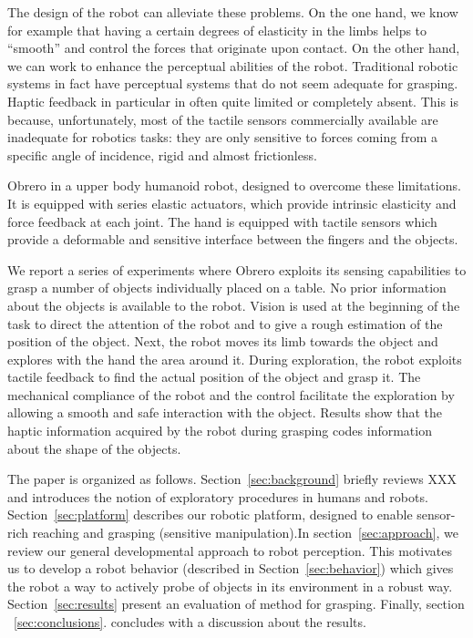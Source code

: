 The design of the robot can alleviate these problems. On the one hand, we know
for example that having a certain degrees of elasticity in the limbs helps to
``smooth''  and control the forces that originate upon contact.
On the other hand, we can work to enhance the perceptual abilities of the robot.
Traditional robotic systems in fact have perceptual systems that do not seem
adequate for grasping. Haptic feedback in particular in often quite limited or
completely absent. This is because, unfortunately, most of the tactile
sensors commercially available are inadequate for robotics tasks: they are only
sensitive to forces coming from a specific angle of incidence, rigid
and almost frictionless.

Obrero\cite{obrero} in a upper body humanoid robot, designed to
overcome these limitations. It is equipped with series elastic
actuators, which provide intrinsic elasticity and force feedback
at each joint. The hand is equipped with tactile sensors
\cite{etorresjSoft} which provide a deformable and sensitive
interface between the fingers and the objects.

We report a series of experiments where Obrero exploits its
sensing capabilities to grasp a number of objects individually
placed on a table. No prior information about the objects is
available to the robot. Vision is used at the beginning of the
task to direct the attention of the robot and to give a rough
estimation of the position of the object. Next, the robot moves
its limb towards the object and explores with the hand the area
around it. During exploration, the robot exploits tactile feedback
to find the actual position of the object and grasp it. The
mechanical compliance of the robot and the control facilitate the
exploration by allowing a smooth and safe interaction with the
object. Results show that the haptic information acquired by
the robot during grasping codes information about the shape of
the objects.

The paper is organized as follows. Section~\ref{sec:background}
briefly reviews XXX and introduces the notion of exploratory
procedures in humans and robots. Section~\ref{sec:platform}
describes our robotic platform, designed to enable sensor-rich
reaching and grasping (sensitive manipulation).In
section~\ref{sec:approach}, we review our general developmental
approach to robot perception. This motivates us to develop a robot
behavior (described in Section~\ref{sec:behavior}) which gives the
robot a way to actively probe of objects in its environment in a
robust way. Section~\ref{sec:results} present an evaluation of
method for grasping. Finally, section ~\ref{sec:conclusions}.
concludes with a discussion about the results.

